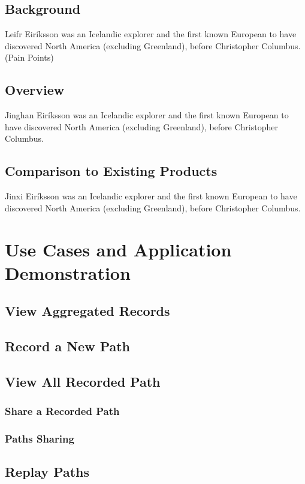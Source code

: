 \documentclass[12pt,a4paper]{article}
\begin{document}
	    \subsection{Background}
	        Leifr Eiríksson was an Icelandic explorer and the first known European to have discovered North America (excluding Greenland), before Christopher Columbus. (Pain Points)
	   \subsection{Overview}
	        Jinghan Eiríksson was an Icelandic explorer and the first known European to have discovered North America (excluding Greenland), before Christopher Columbus.
	   \subsection{Comparison to Existing Products}
	        Jinxi Eiríksson was an Icelandic explorer and the first known European to have discovered North America (excluding Greenland), before Christopher Columbus.
    \clearpage
    
    
    \section{Use Cases and Application Demonstration}
        \subsection{View Aggregated Records} %
        \subsection{Record a New Path} %
        \subsection{View All Recorded Path} %
            \subsubsection{Share a Recorded Path}
            \subsubsection{Paths Sharing}
        \subsection{Replay Paths} %
\end{document}
